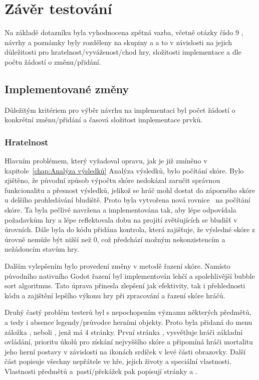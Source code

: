 \section{Závěr testování}
Na základě dotazníku byla vyhodnocena zpětná vazba, včetně otázky číslo 9 , návrhy a poznámky byly rozděleny na skupiny  a  a to v závislosti na jejich důležitosti pro hratelnost/vyváženost/chod hry, složitosti implementace a dle počtu žádostí o změnu/přidání.

\subsection*{Implementované změny}
Důležitým kritériem pro výběr návrhu na implementaci byl počet žádostí o konkrétní změnu/přidání a časová složitost implementace prvků.

\subsubsection*{\textbullet Hratelnost}
Hlavním problémem, který vyžadoval opravu, jak je již zmíněno v kapitole~\ref{chap:Analýza výsledků} Analýza výsledků, bylo počítání skóre. Bylo zjištěno, že původní způsob výpočtu skóre nedokázal zaručit správnou funkcionalitu a přesnost výsledků, jelikož se hráč mohl dostat do záporného skóre u delšího prohledávání bludiště. Proto byla vytvořena nová rovnice~ na počítání skóre. Ta byla pečlivě navržena a implementována tak, aby lépe odpovídala požadavkům hry a lépe reflektovala dobu na projití zvětšujících se bludišť v úrovních. Dále byla do kódu přidána kontrola, která zajišťuje, že výsledné skóre z úrovně nemůže být nižší než 0, což předchází možným nekonzistencím a nežádoucím stavům hry.

Dalším vylepšením bylo provedení změny v metodě řazení skóre. Namísto původního nativního Godot řazení byl implementován lehčí a spolehlivější bubble sort algoritmus. Tato úprava přinesla zlepšení jak efektivity, tak i přehlednosti kódu a zajištění lepšího výkonu hry při zpracování a řazení skóre hráčů.

Druhý častý problém testerů byl s nepochopením významu některých předmětů, a tedy i absence legendy/průvodce herními objekty. Proto byla přidaná do menu záložka , neboli , jenž má 4 stránky. První stránka , vysvětluje hráči základní ovládání, prioritu úkolů pro získání nejvyššího skóre a připomíná hráči mortalitu jeho herní postavy v závislosti na ikonách srdíček v levé části obrazovky. Další část  popisuje všechny nepřátele ve hře, jejich životy a speciální vlastnosti. Vlastnosti předmětů a~pastí/překážek pak popisují stránky  a .

